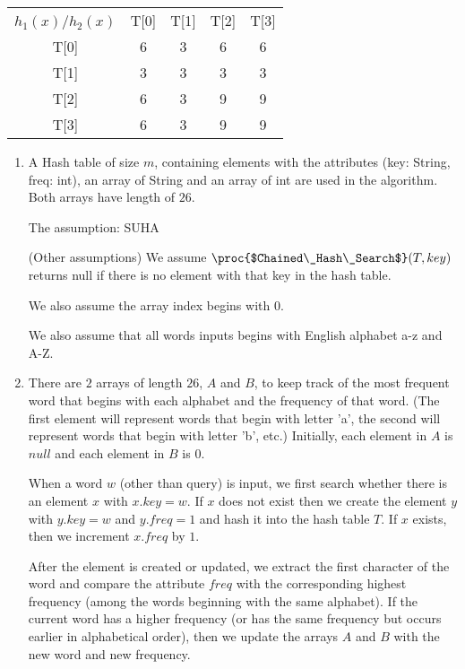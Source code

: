 \documentclass[11pt, answers]{exam}
\theoremstyle{plain}
\theoremstyle{definition}
\begin{document}
\begin{questions}
\begin{solution}
\begin{parts}
\centering
\begin{tabular}{ccccc}
$h_1(x)$/$h_2(x)$    & T{[}0{]} & T{[}1{]} & T{[}2{]} & T{[}3{]} \\
T{[}0{]} & 6        & 3        & 6        & 6        \\
T{[}1{]} & 3        & 3        & 3        & 3        \\
T{[}2{]} & 6        & 3        & 9        & 9        \\
T{[}3{]} & 6        & 3        & 9        & 9       
\end{tabular}




\end{parts}
\end{solution}


\question
\begin{solution}
\begin{enumerate}
\item A Hash table of size $m$, containing elements with the attributes (key: String, freq: int), an array of String and an array of int are used in the algorithm. Both arrays have length of $26$.

The assumption: SUHA

(Other assumptions)
We assume $\proc{$Chained\_Hash\_Search$}(T, key)$ returns null if there is no element with that key in the hash table.

We also assume the array index begins with 0.

We also assume that all words inputs begins with English alphabet a-z and A-Z.

\item There are $2$ arrays of length $26$, $A$ and $B$, to keep track of the most frequent word that begins with each alphabet and the frequency of that word. (The first element will represent words that begin with letter 'a', the second will represent words that begin with letter 'b', etc.) Initially, each element in $A$ is $null$ and each element in $B$ is $0$. 

When a word $w$ (other than query) is input, we first search whether there is an element $x$ with $x.key=w$. If $x$ does not exist then we create the element $y$ with $y.key=w$ and $y.freq=1$ and hash it into the hash table $T$. If $x$ exists, then we increment $x.freq$ by $1$.

After the element is created or updated, we extract the first character of the word and compare the attribute $freq$ with the corresponding highest frequency (among the words beginning with the same alphabet). If the current word has a higher frequency (or has the same frequency but occurs earlier in alphabetical order), then we update the arrays $A$ and $B$ with the new word and new frequency. 


\end{enumerate}
\end{solution}
\end{questions}
\end{document}
